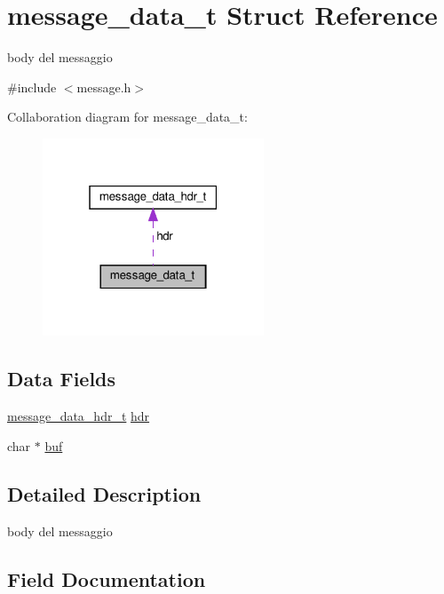 \hypertarget{structmessage__data__t}{}\section{message\+\_\+data\+\_\+t Struct Reference}
\label{structmessage__data__t}


body del messaggio  




{\ttfamily \#include $<$message.\+h$>$}



Collaboration diagram for message\+\_\+data\+\_\+t\+:\nopagebreak
\begin{figure}[H]
\begin{center}
\leavevmode
\includegraphics[width=187pt]{structmessage__data__t__coll__graph}
\end{center}
\end{figure}
\subsection*{Data Fields}
\begin{DoxyCompactItemize}
\item 
\hyperlink{structmessage__data__hdr__t}{message\+\_\+data\+\_\+hdr\+\_\+t} \hyperlink{structmessage__data__t_ad76687ebed3a13ddae03410b64f3b134}{hdr}
\item 
char $\ast$ \hyperlink{structmessage__data__t_a1fe855c208bc17a51a4d34fefdb2d5b1}{buf}
\end{DoxyCompactItemize}


\subsection{Detailed Description}
body del messaggio 

\subsection{Field Documentation}
\mbox{\label{structmessage__data__t_a1fe855c208bc17a51a4d34fefdb2d5b1}} 
